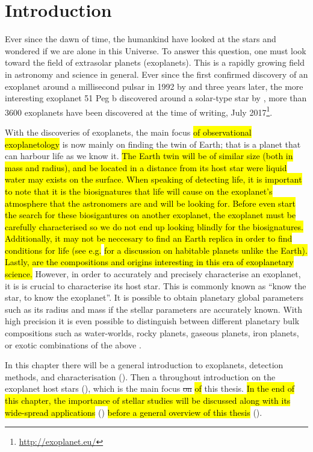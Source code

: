 \chapter{Introduction}
\label{cha:introduction}

Ever since the dawn of time, the humankind have looked at the stars and wondered if we are alone in
this Universe. To answer this question, one must look toward the field of extrasolar planets
(exoplanets). This is a rapidly growing field in astronomy and science in general. Ever since the
first confirmed discovery of an exoplanet around a millisecond pulsar in 1992 by
\citet{Wolszczan1992} and three years later, the more interesting exoplanet 51 Peg b discovered
around a solar-type star by \citet{Mayor1995}, more than 3600 exoplanets have been discovered at the
time of writing, July 2017\footnote{\url{http://exoplanet.eu/}}.

With the discoveries of exoplanets, the main focus \hl{of observational exoplanetology} is now
mainly on finding the twin of Earth; that is a planet that can harbour life as we know it. \hl{The
Earth twin will be of similar size (both in mass and radius), and be located in a distance from its
host star were liquid water may exists on the surface. When speaking of detecting life, it is
important to note that it is the biosignatures that life will cause on the exoplanet's atmosphere
that the astronomers are and will be looking for. Before even start the search for these
biosigantures on another exoplanet, the exoplanet must be carefully characterised so we do not end
up looking blindly for the biosignatures. Additionally, it may not be neccesary to find an Earth
replica in order to find conditions for life (see e.g.} \citet{Alibert2014} \hl{for a discussion on
habitable planets unlike the Earth). Lastly, are the compositions and origins interesting in this
era of exoplanetary science.} However, in order to accurately and precisely characterise an
exoplanet, it is is crucial to characterise its host star. This is commonly known as ``know the
star, to know the exoplanet''. It is possible to obtain planetary global parameters such as its
radius and mass if the stellar parameters are accurately known. With high precision it is even
possible to distinguish between different planetary bulk compositions such as water-worlds, rocky
planets, gaseous planets, iron planets, or exotic combinations of the above \citep[see
e.g.][]{Dorn2015,Thiabaud2014}.

In this chapter there will be a general introduction to exoplanets, detection methods, and
characterisation (). Then a throughout introduction on the exoplanet host stars
(), which is the main focus \st{on} \hl{of} this thesis. \hl{In the end
of this chapter, the importance of stellar studies will be discussed along with its wide-spread
applications} () \hl{before a general overview of this thesis}
().



